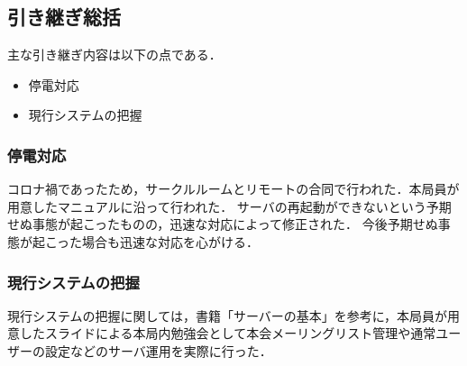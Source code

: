 \subsection*{引き継ぎ総括}

主な引き継ぎ内容は以下の点である．
\begin{itemize}
	\item 停電対応
	\item 現行システムの把握
\end{itemize}

\subsubsection*{停電対応}
コロナ禍であったため，サークルルームとリモートの合同で行われた．本局員が用意したマニュアルに沿って行われた．
サーバの再起動ができないという予期せぬ事態が起こったものの，迅速な対応によって修正された．
今後予期せぬ事態が起こった場合も迅速な対応を心がける．

\subsubsection*{現行システムの把握}
現行システムの把握に関しては，書籍「サーバーの基本」を参考に，本局員が用意したスライドによる本局内勉強会として本会メーリングリスト管理や通常ユーザーの設定などのサーバ運用を実際に行った．

